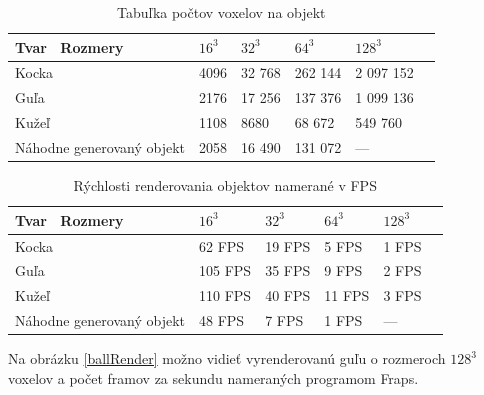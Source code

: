 \begin{table}[hp]
  \centering
  \begin{tabular}{|l|l|l|l|l|l|}
  \hline
  Tvar \ Rozmery & 
  \begin{math}16^3\end{math} & 
  \begin{math}32^3\end{math} & 
  \begin{math}64^3\end{math} & 
  \begin{math}128^3\end{math} \\
  \hline
  Kocka & 4096 & 32 768 & 262 144 & 2 097 152\\
  \hline
  Guľa & 2176 & 17 256 & 137 376 & 1 099 136\\
  \hline
  Kužeľ & 1108 & 8680 & 68 672 & 549 760\\
  \hline
  Náhodne generovaný objekt & 2058 & 16 490 & 131 072 & --- \\ 
  \hline
  \end{tabular}
  \caption{Tabuľka počtov voxelov na objekt}
  \label{tab:voxels}
\end{table}


\begin{table}[!h]
  \centering
  \begin{tabular}{|l|l|l|l|l|l|}
  \hline
  Tvar \ Rozmery & 
  \begin{math}16^3\end{math} & 
  \begin{math}32^3\end{math} & 
  \begin{math}64^3\end{math} & 
  \begin{math}128^3\end{math} \\
  \hline
  Kocka & 62 FPS & 19 FPS & 5 FPS & 1 FPS \\
  \hline
  Guľa & 105 FPS & 35 FPS & 9 FPS & 2 FPS \\
  \hline
  Kužeľ & 110 FPS & 40 FPS & 11 FPS & 3 FPS \\
  \hline
  Náhodne generovaný objekt & 48 FPS & 7 FPS & 1 FPS & --- \\ 
  \hline
  \end{tabular}
  \caption{Rýchlosti renderovania objektov namerané v FPS}
  \label{tab:fps}
\end{table}

Na obrázku \ref{ballRender} možno vidieť vyrenderovanú guľu o rozmeroch $128^3$ voxelov a počet framov za sekundu nameraných programom Fraps.

